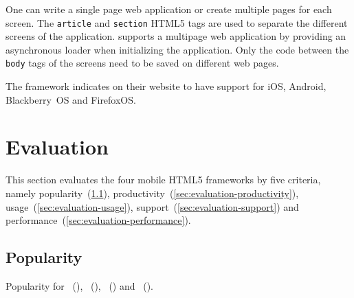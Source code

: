 \documentclass[a4paper]{artikel3}
\newcommand{\code}[1]{\texttt{#1}}
\newcommand{\setspace}[0]{\vspace{2mm}}
\renewcommand{\paragraph}[1]{\setspace \noindent {\bf #1}  }
\begin{document}
One can write a single page web application or create multiple pages for each screen.
The \code{article} and \code{section} HTML5 tags are used to separate the different screens of the application.
\lungo{} supports a multipage web application by providing an asynchronous loader when initializing the application.
Only the code between the \code{body} tags of the screens need to be saved on different web pages.

\paragraph{Browser support}
The framework indicates on their website to have support for iOS, Android, Blackberry~OS and FirefoxOS.


\section{Evaluation}
This section evaluates the four mobile HTML5 frameworks by five criteria, namely popularity~(\ref{sec:evaluation-popularity}), productivity~(\ref{sec:evaluation-productivity}), usage~(\ref{sec:evaluation-usage}), support~(\ref{sec:evaluation-support}) and performance~(\ref{sec:evaluation-performance}).

\subsection{Popularity} %
\label{sec:evaluation-popularity}

\begin{table}[t]
\centering
\resizebox{\columnwidth}{!} {
}
\caption{Popularity for \st{}~(\sta), \kendo{}~(\kendoa), \jqm{}~(\jqma) and \lungo{}~(\lungoa).}
\label{tabel:evaluatie-popularity}
\end{table}
\end{document}
